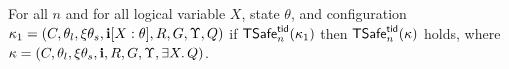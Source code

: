 %


\begin{lemma}[Exists$_{2}$]\label{lem:EXists}
For all $n$ and for all logical variable $X$, state $\theta$,
and configuration 
$\kappa_1=(C,\theta_l,\xi\theta_s,{\bf i}[X:\theta],R,G,\Upsilon, Q)$
if ${\sf TSafe}^{{\sf tid}}_n(\kappa_1)$ %
then  
${\sf TSafe}^{{\sf tid}}_n(\kappa)$ holds,
where $\kappa=(C,\theta_l,\xi\theta_s,{\bf i},R,G,\Upsilon, \exists X.\, Q)$.
\end{lemma}

